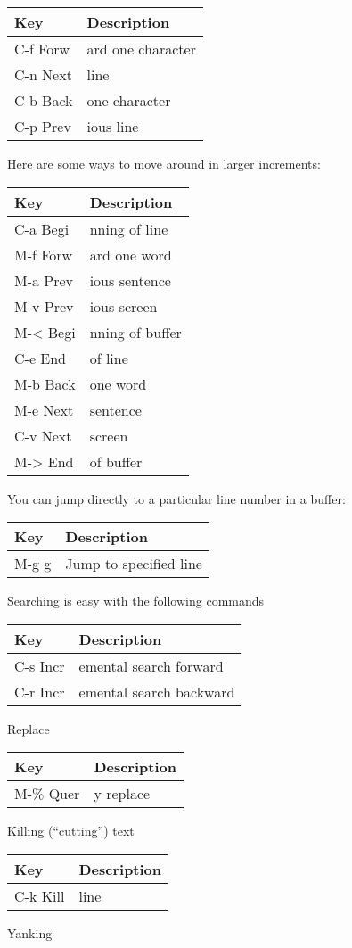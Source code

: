 \begin{longtable}[]{@{}ll@{}}
\toprule
Key & Description\tabularnewline
\midrule
\endhead
C-f Forw & ard one character\tabularnewline
C-n Next & line\tabularnewline
C-b Back & one character\tabularnewline
C-p Prev & ious line\tabularnewline
\bottomrule
\end{longtable}

Here are some ways to move around in larger increments:

\begin{longtable}[]{@{}ll@{}}
\toprule
Key & Description\tabularnewline
\midrule
\endhead
C-a Begi & nning of line\tabularnewline
M-f Forw & ard one word\tabularnewline
M-a Prev & ious sentence\tabularnewline
M-v Prev & ious screen\tabularnewline
M-\textless{} Begi & nning of buffer\tabularnewline
C-e End & of line\tabularnewline
M-b Back & one word\tabularnewline
M-e Next & sentence\tabularnewline
C-v Next & screen\tabularnewline
M-\textgreater{} End & of buffer\tabularnewline
\bottomrule
\end{longtable}

You can jump directly to a particular line number in a buffer:

\begin{longtable}[]{@{}ll@{}}
\toprule
Key & Description\tabularnewline
\midrule
\endhead
M-g g & Jump to specified line\tabularnewline
\bottomrule
\end{longtable}

Searching is easy with the following commands

\begin{longtable}[]{@{}ll@{}}
\toprule
Key & Description\tabularnewline
\midrule
\endhead
C-s Incr & emental search forward\tabularnewline
C-r Incr & emental search backward\tabularnewline
\bottomrule
\end{longtable}

Replace

\begin{longtable}[]{@{}ll@{}}
\toprule
Key & Description\tabularnewline
\midrule
\endhead
M-\% Quer & y replace\tabularnewline
\bottomrule
\end{longtable}

Killing (``cutting'') text

\begin{longtable}[]{@{}ll@{}}
\toprule
Key & Description\tabularnewline
\midrule
\endhead
C-k Kill & line\tabularnewline
\bottomrule
\end{longtable}

Yanking

